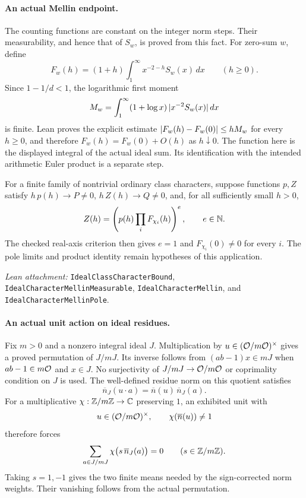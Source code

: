\paragraph{An actual Mellin endpoint.}
The counting functions are constant on the integer norm steps. Their
measurability, and hence that of $S_w$, is proved from this fact.
For zero-sum $w$, define
\[
 F_w(h)=(1+h)\int_1^{\infty}x^{-2-h}S_w(x)\,dx
 \qquad(h\geq0).
\]
Since $1-1/d<1$, the logarithmic first moment
\[
 M_w=\int_1^{\infty}(1+\log x)\,\lvert x^{-2}S_w(x)\rvert\,dx
\]
is finite. Lean proves the explicit estimate
$\lvert F_w(h)-F_w(0)\rvert\leq hM_w$ for every $h\geq0$, and therefore
$F_w(h)=F_w(0)+O(h)$ as $h\downarrow0$.
The function here is the displayed integral of the actual ideal sum.
Its identification with the intended arithmetic Euler product is a separate step.

For a finite family of nontrivial ordinary class characters, suppose functions
$p,Z$ satisfy $h\,p(h)\to P\ne0$, $h\,Z(h)\to Q\ne0$, and, for all sufficiently
small $h>0$,
\[
 Z(h)=\left(p(h)\prod_i F_{\chi_i}(h)\right)^e,
 \qquad e\in\mathbb N.
\]
The checked real-axis criterion then gives $e=1$ and
$F_{\chi_i}(0)\ne0$ for every $i$. The pole limits and product identity
remain hypotheses of this application.

\smallskip
\noindent\emph{Lean attachment:}
\nolinkurl{IdealClassCharacterBound}, \nolinkurl{IdealCharacterMellinMeasurable},
\nolinkurl{IdealCharacterMellin}, and \nolinkurl{IdealCharacterMellinPole}.

\newpage
\paragraph{An actual unit action on ideal residues.}
Fix $m>0$ and a nonzero integral ideal $J$.
Multiplication by $u\in(\mathcal O/m\mathcal O)^{\times}$ gives a proved permutation of
$J/mJ$. Its inverse follows from $(ab-1)x\in mJ$ when
$ab-1\in m\mathcal O$ and $x\in J$. No surjectivity of
$J/mJ\to\mathcal O/m\mathcal O$ or coprimality condition on $J$ is used.
The well-defined residue norm on this quotient satisfies
\[
 \overline n_J(u\cdot a)=\overline n(u)\,\overline n_J(a).
\]
For a multiplicative $\chi:\mathbb Z/m\mathbb Z\to\mathbb C$ preserving $1$, an exhibited
unit with
\begin{equation}\label{eq:unit-witness}
 u\in(\mathcal O/m\mathcal O)^{\times},\qquad \chi(\overline n(u))\ne1
\end{equation}
therefore forces
\[
 \sum_{a\in J/mJ}\chi\bigl(s\,\overline n_J(a)\bigr)=0
 \qquad(s\in\mathbb Z/m\mathbb Z).
\]
Taking $s=1,-1$ gives the two finite means needed by the sign-corrected
norm weights. Their vanishing follows from the actual permutation.

